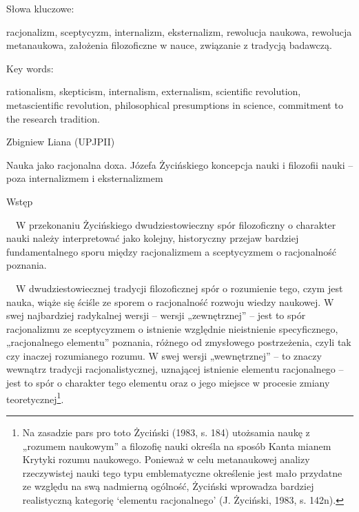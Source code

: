 \documentclass{article}
\begin{document}
Słowa kluczowe:

racjonalizm, sceptycyzm, internalizm, eksternalizm, rewolucja naukowa, rewolucja metanaukowa, założenia filozoficzne w
nauce, związanie z tradycją badawczą.

Key words:

rationalism, skepticism, internalism, externalism, scientific revolution, metascientific revolution, philosophical
presumptions in science, commitment to the research tradition.

Zbigniew Liana (UPJPII)

Nauka jako racjonalna doxa. Józefa Życińskiego koncepcja nauki i filozofii nauki – poza internalizmem i eksternalizmem

Wstęp

\ \ W przekonaniu Życińskiego dwudziestowieczny spór filozoficzny o charakter nauki należy interpretować jako kolejny,
historyczny przejaw bardziej fundamentalnego sporu między racjonalizmem a sceptycyzmem o racjonalność poznania.

\ \ W dwudziestowiecznej tradycji filozoficznej spór o rozumienie tego, czym jest nauka, wiąże się ściśle ze sporem o
racjonalność rozwoju wiedzy naukowej. W swej najbardziej radykalnej wersji – wersji „zewnętrznej” – jest to spór
racjonalizmu ze sceptycyzmem o istnienie względnie nieistnienie specyficznego, „racjonalnego elementu” poznania,
różnego od zmysłowego postrzeżenia, czyli tak czy inaczej rozumianego rozumu. W swej wersji „wewnętrznej” – to znaczy
wewnątrz tradycji racjonalistycznej, uznającej istnienie elementu racjonalnego – jest to spór o charakter tego elementu
oraz o jego miejsce w procesie zmiany teoretycznej\footnote{Na zasadzie pars pro toto Życiński
\label{ref:RND1yjaBGa3S8}(1983, s. 184) utożsamia naukę z „rozumem naukowym” a filozofię nauki określa na sposób Kanta
mianem Krytyki rozumu naukowego. Ponieważ w celu metanaukowej analizy rzeczywistej nauki tego typu emblematyczne
określenie jest mało przydatne ze względu na swą nadmierną ogólność, Życiński wprowadza bardziej realistyczną kategorię
‘elementu racjonalnego’ \label{ref:RNDZsYVuB7lRL}(J. Życiński, 1983, s. 142n).}.
\end{document}
